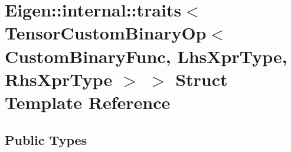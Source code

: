 \hypertarget{struct_eigen_1_1internal_1_1traits_3_01_tensor_custom_binary_op_3_01_custom_binary_func_00_01_lh13ec16c8467537dd695eeaba8e396b16}{}\section{Eigen\+:\+:internal\+:\+:traits$<$ Tensor\+Custom\+Binary\+Op$<$ Custom\+Binary\+Func, Lhs\+Xpr\+Type, Rhs\+Xpr\+Type $>$ $>$ Struct Template Reference}
\label{struct_eigen_1_1internal_1_1traits_3_01_tensor_custom_binary_op_3_01_custom_binary_func_00_01_lh13ec16c8467537dd695eeaba8e396b16}
\subsection*{Public Types}
